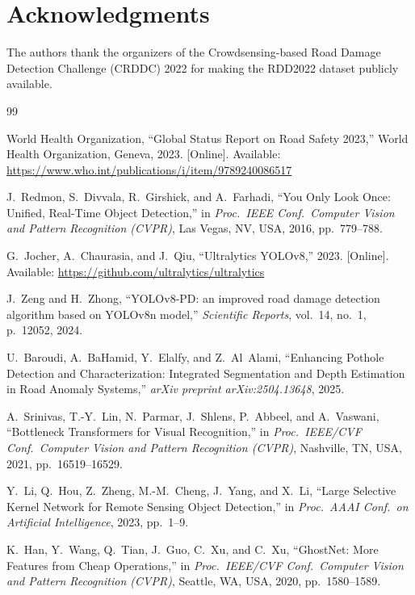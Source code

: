 \documentclass[conference]{IEEEtran}
\begin{document}
\section*{Acknowledgments}
The authors thank the organizers of the Crowdsensing-based Road Damage Detection Challenge (CRDDC) 2022 for making the RDD2022 dataset publicly available.



\begin{thebibliography}{99}

World Health Organization, ``Global Status Report on Road Safety 2023,'' World Health Organization, Geneva, 2023. [Online]. Available: \url{https://www.who.int/publications/i/item/9789240086517}

J.~Redmon, S.~Divvala, R.~Girshick, and A.~Farhadi, ``You Only Look Once: Unified, Real-Time Object Detection,'' in \textit{Proc.\ IEEE Conf.\ Computer Vision and Pattern Recognition (CVPR)}, Las Vegas, NV, USA, 2016, pp.~779--788.

G.~Jocher, A.~Chaurasia, and J.~Qiu, ``Ultralytics YOLOv8,'' 2023. [Online]. Available: \url{https://github.com/ultralytics/ultralytics}

J.~Zeng and H.~Zhong, ``YOLOv8-PD: an improved road damage detection algorithm based on YOLOv8n model,'' \textit{Scientific Reports}, vol.~14, no.~1, p.~12052, 2024.

U.~Baroudi, A.~BaHamid, Y.~Elalfy, and Z.~Al~Alami, ``Enhancing Pothole Detection and Characterization: Integrated Segmentation and Depth Estimation in Road Anomaly Systems,'' \textit{arXiv preprint arXiv:2504.13648}, 2025.

A.~Srinivas, T.-Y.~Lin, N.~Parmar, J.~Shlens, P.~Abbeel, and A.~Vaswani, ``Bottleneck Transformers for Visual Recognition,'' in \textit{Proc.\ IEEE/CVF Conf.\ Computer Vision and Pattern Recognition (CVPR)}, Nashville, TN, USA, 2021, pp.~16519--16529.

Y.~Li, Q.~Hou, Z.~Zheng, M.-M.~Cheng, J.~Yang, and X.~Li, ``Large Selective Kernel Network for Remote Sensing Object Detection,'' in \textit{Proc.\ AAAI Conf.\ on Artificial Intelligence}, 2023, pp.~1--9.

K.~Han, Y.~Wang, Q.~Tian, J.~Guo, C.~Xu, and C.~Xu, ``GhostNet: More Features from Cheap Operations,'' in \textit{Proc.\ IEEE/CVF Conf.\ Computer Vision and Pattern Recognition (CVPR)}, Seattle, WA, USA, 2020, pp.~1580--1589.


\end{thebibliography}
\end{document}
